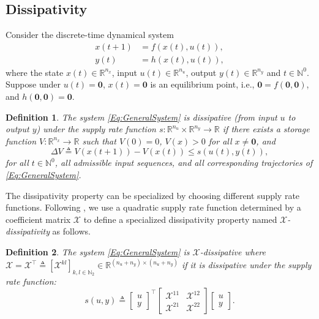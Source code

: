 \documentclass[letterpaper, 10 pt, conference]{ieeeconf}%
\newcommand{\R}{\mathbb{R}}
\newcommand{\N}{\mathbb{N}}
\newcommand{\T}{\top}
\newcommand{\0}{\mathbf{0}}
\newcommand{\X}{\mathcal{X}}
\newcommand{\Y}{\mathcal{Y}}
\newcommand{\y}{{\scriptstyle \Y}}
\newcommand{\bm}[1]{\begin{bmatrix}#1\end{bmatrix}}
\newtheorem{lemma}{\textbf{Lemma}}
\newtheorem{definition}{\textbf{Definition}}
\begin{document}



\subsection{Dissipativity}\label{SubSec:dissipativity}

Consider the discrete-time dynamical system  
\begin{equation}\label{Eq:GeneralSystem}
\begin{aligned}
    x(t+1) &= f(x(t),u(t)),\\
    y(t) &= h(x(t),u(t)),
    \end{aligned}
\end{equation}
where the state $x(t)\in\R^{n_x}$, input $u(t)\in \R^{n_u}$, output $y(t)\in\R^{n_y}$ and $t\in\N^0$. Suppose under $u(t)=\0$, $x(t)=\0$ is an equilibrium point, i.e., $\0 = f(\0,\0)$, and $h(\0,\0) = \0$.

\begin{definition}\label{Def:Dissipativity}
The system \eqref{Eq:GeneralSystem} is \emph{dissipative} (from input $u$ to output $y$) under the \emph{supply rate function} $s:\R^{n_u}\times\R^{n_y}\rightarrow \R$ if there exists a \emph{storage function} $V: \R^{n_x} \rightarrow \R$ such that $V(0)=0$, $V(x)>0$ for all $x\neq \0$, and 
$$
\Delta V \triangleq V(x(t+1)) - V(x(t)) 
\leq  s(u(t),y(t)),
$$
for all $t\in\N^0$, all admissible input sequences, and all corresponding trajectories of \eqref{Eq:GeneralSystem}.
\end{definition}

The dissipativity property can be specialized by choosing different supply rate functions. Following \cite{WelikalaP52022}, we use a quadratic supply rate function determined by a coefficient matrix $\X$ to define a specialized dissipativity property named \emph{$\X$-dissipativity} as follows.

\begin{definition}\label{Def:X-Dissipativity}
The system \eqref{Eq:GeneralSystem} is \emph{$\X$-dissipative} where $\X = \X^\T \triangleq [\X^{kl}]_{k,l\in\N_2} \in\R^{(n_u+n_y)\times(n_u+n_y)}$ if it is dissipative under the supply rate function:
$$
s(u, y) \triangleq 
    \bm{u\\ y}^\T 
    \bm{\X^{11} & \X^{12}\\\X^{21} & \X^{22}}
    \bm{u\\y}.
$$
\end{definition}
\end{document}
